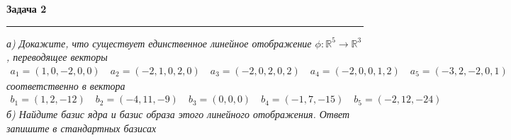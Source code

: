 \documentclass[a4paper,11pt]{article}
\begin{document}


\textbf{\large Задача 2}
\medskip\hrule\medskip
\textit{а) Докажите, что существует единственное линейное отображение $ \phi: \mathbb{R}^5 \rightarrow \mathbb{R}^3 $, переводящее векторы}
\begin{align*}
	a_1 = (1, 0, -2, 0, 0) \quad a_2 = (-2, 1, 0, 2, 0) \quad a_3 = (-2, 0, 2, 0, 2) \quad a_4 = (-2, 0, 0, 1, 2) \quad a_5 = (-3, 2, -2, 0, 1)
\end{align*}
\textit{соответственно в вектора}
\begin{align*}
	b_1 = (1, 2, -12) \quad b_2 = (-4, 11, -9) \quad b_3 = (0, 0, 0) \quad b_4 = (-1, 7, -15) \quad b_5 = (-2, 12, -24)
\end{align*}
\textit{б) Найдите базис ядра и базис образа этого линейного отображения. Ответ запишите в стандартных базисах} \\ \\
\end{document}
